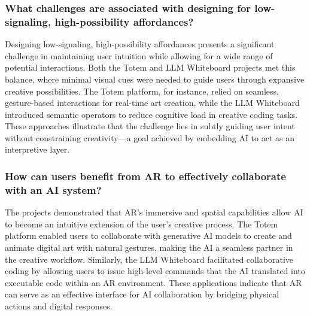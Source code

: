 

\subsubsection{What challenges are associated with designing for low-signaling, high-possibility affordances?}
Designing low-signaling, high-possibility affordances presents a significant challenge in maintaining user intuition while allowing for a wide range of potential interactions.
Both the Totem and LLM Whiteboard projects met this balance, where minimal visual cues were needed to guide users through expansive creative possibilities.
The Totem platform, for instance, relied on seamless, gesture-based interactions for real-time art creation, while the LLM Whiteboard introduced semantic operators to reduce cognitive load in creative coding tasks.
These approaches illustrate that the challenge lies in subtly guiding user intent without constraining creativity—a goal achieved by embedding AI to act as an interpretive layer.%
    
\subsubsection{How can users benefit from AR to effectively collaborate with an AI system?}

The projects demonstrated that AR’s immersive and spatial capabilities allow AI to become an intuitive extension of the user's creative process.
The Totem platform enabled users to collaborate with generative AI models to create and animate digital art with natural gestures, making the AI a seamless partner in the creative workflow.
Similarly, the LLM Whiteboard facilitated collaborative coding by allowing users to issue high-level commands that the AI translated into executable code within an AR environment.
These applications indicate that AR can serve as an effective interface for AI collaboration by bridging physical actions and digital responses.%


